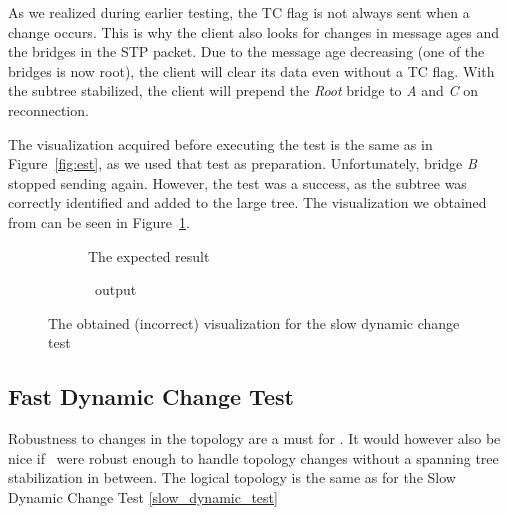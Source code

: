 As we realized during earlier testing, the TC flag is not always sent when a change occurs.
This is why the client also looks for changes in message ages and the bridges in the STP packet.
Due to the message age decreasing (one of the bridges is now root), the client will clear its data even without a TC flag.
With the subtree stabilized, the client will prepend the \textit{Root} bridge to \textit{A} and \textit{C} on reconnection. 

The visualization acquired before executing the test is the same as in Figure~\ref{fig:est}, as we used that test as preparation.
Unfortunately, bridge \textit{B} stopped sending again.
However, the test was a success, as the subtree was correctly identified and added to the large tree.
The visualization we obtained from \tool can be seen in Figure~\ref{fig:dynAfter}.
\begin{figure}[h]
    \begin{subfigure}[b]{\textwidth}
        \centering
        \caption{The expected result}
    \end{subfigure}
       
    \vspace{0.5cm}

    \begin{subfigure}[b]{\textwidth}
        \centering
        
        \caption{\tool\ output}
    \end{subfigure}
    \caption{The obtained (incorrect) visualization for the slow dynamic change test}
    \label{fig:dynAfter}
\end{figure}

\subsection*{Fast Dynamic Change Test}
\label{fast_dynamic_test}
Robustness to changes in the topology are a must for \tool.
It would however also be nice if \tool\ were robust enough to handle topology changes without a spanning tree stabilization in between.
The logical topology is the same as for the Slow Dynamic Change Test \ref{slow_dynamic_test}

